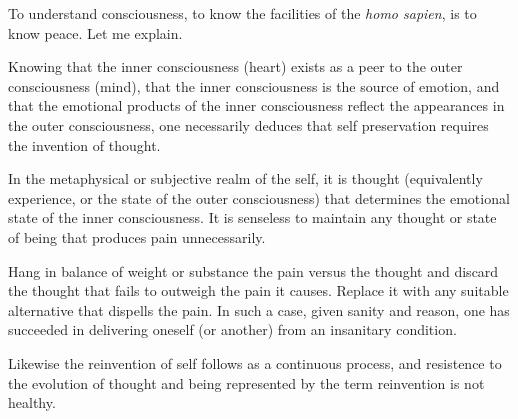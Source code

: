 

To understand consciousness, to know the facilities of the {\it homo
sapien}, is to know peace.  Let me explain.  

Knowing that the inner consciousness (heart) exists as a peer to the
outer consciousness (mind), that the inner consciousness is the source
of emotion, and that the emotional products of the inner consciousness
reflect the appearances in the outer consciousness, one necessarily
deduces that self preservation requires the invention of thought.

In the metaphysical or subjective realm of the self, it is thought
(equivalently experience, or the state of the outer consciousness)
that determines the emotional state of the inner consciousness.  It is
senseless to maintain any thought or state of being that produces pain
unnecessarily.  

Hang in balance of weight or substance the pain versus the thought and
discard the thought that fails to outweigh the pain it causes.
Replace it with any suitable alternative that dispells the pain.  In
such a case, given sanity and reason, one has succeeded in delivering
oneself (or another) from an insanitary condition.

Likewise the reinvention of self follows as a continuous process, and
resistence to the evolution of thought and being represented by the
term reinvention is not healthy.

\bye
